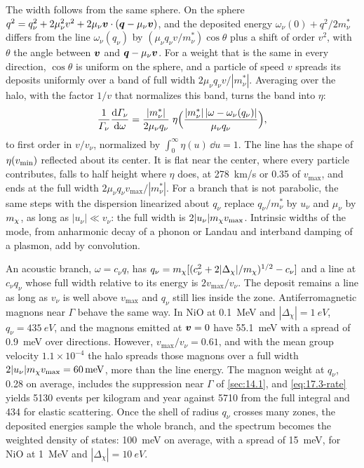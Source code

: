 The width follows from the same sphere. On the sphere $q^2 = q_\nu^2 + 2\mu_\nu^2v^2 + 2\mu_\nu\bm{v}\cdot(\bm{q} - \mu_\nu\bm{v})$, and the deposited energy $\omega_\nu(0) + q^2/2m^*_\nu$ differs from the line $\omega_\nu(q_\nu)$ by $(\mu_\nu q_\nu v/m^*_\nu)\cos\theta$ plus a shift of order $v^2$, with $\theta$ the angle between $\bm{v}$ and $\bm{q} - \mu_\nu\bm{v}$. For a weight that is the same in every direction, $\cos\theta$ is uniform on the sphere, and a particle of speed $v$ spreads its deposits uniformly over a band of full width $2\mu_\nu q_\nu v/|m^*_\nu|$. Averaging over the halo, with the factor $1/v$ that normalizes this band, turns the band into $\eta$:
\begin{equation}
  \frac{1}{\varGamma_\nu}\frac{\mathrm{d}\varGamma_\nu}{\mathrm{d}\omega} = \frac{|m^*_\nu|}{2\mu_\nu q_\nu}\;\eta\Bigl(\frac{|m^*_\nu|\,|\omega - \omega_\nu(q_\nu)|}{\mu_\nu q_\nu}\Bigr) ,
  \label{eq:17.3-profile}
\end{equation}
to first order in $v/v_\nu$, normalized by $\int_0^\infty\eta(u)\,\dd u = 1$. The line has the shape of $\eta(v_{\mathrm{min}})$ reflected about its center. It is flat near the center, where every particle contributes, falls to half height where $\eta$ does, at \SI{278}{km/s} or 0.35 of $v_{\mathrm{max}}$, and ends at the full width $2\mu_\nu q_\nu v_{\mathrm{max}}/|m^*_\nu|$. For a branch that is not parabolic, the same steps with the dispersion linearized about $q_\nu$ replace $q_\nu/m^*_\nu$ by $u_\nu$ and $\mu_\nu$ by $m_{\chi}$, as long as $|u_\nu| \ll v_\nu$: the full width is $2|u_\nu|m_{\chi} v_{\mathrm{max}}$. Intrinsic widths of the mode, from anharmonic decay of a phonon or Landau and interband damping of a plasmon, add by convolution.

An acoustic branch, $\omega = c_\nu q$, has $q_\nu = m_{\chi}[(c_\nu^2 + 2|\Delta_\chi|/m_{\chi})^{1/2} - c_\nu]$ and a line at $c_\nu q_\nu$ whose full width relative to its energy is $2v_{\mathrm{max}}/v_\nu$. The deposit remains a line as long as $v_\nu$ is well above $v_{\mathrm{max}}$ and $q_\nu$ still lies inside the zone. Antiferromagnetic magnons near $\Gamma$ behave the same way. In NiO at \SI{0.1}{MeV} and $|\Delta_\chi| = \SI{1}{eV}$, $q_\nu = \SI{435}{eV}$, and the magnons emitted at $\bm{v} = 0$ have \SI{55.1}{meV} with a spread of \SI{0.9}{meV} over directions. However, $v_{\mathrm{max}}/v_\nu = 0.61$, and with the mean group velocity $1.1\times10^{-4}$ the halo spreads those magnons over a full width $2|u_\nu|m_{\chi} v_{\mathrm{max}} = \SI{60}{meV}$, more than the line energy. The magnon weight at $q_\nu$, 0.28 on average, includes the suppression near $\Gamma$ of \cref{sec:14.1}, and \cref{eq:17.3-rate} yields 5130 events per kilogram and year against 5710 from the full integral and 434 for elastic scattering. Once the shell of radius $q_\nu$ crosses many zones, the deposited energies sample the whole branch, and the spectrum becomes the weighted density of states: \SI{100}{meV} on average, with a spread of \SI{15}{meV}, for NiO at \SI{1}{MeV} and $|\Delta_\chi| = \SI{10}{eV}$.

